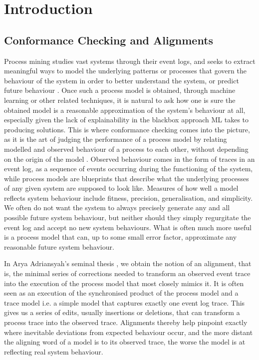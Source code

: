 \documentclass[conference]{IEEEtran}
\begin{document}
	\section{Introduction} 
	
	
	\subsection{Conformance Checking and Alignments} 
	
	Process mining studies vast systems through their event logs, and seeks to extract meaningful ways to model the underlying patterns or processes that govern the behaviour of the system in order to better understand the system, or predict future behaviour \cite{A16}.
	Once such a process model is obtained, through machine learning or other related techniques, it is natural to ask how one is sure the obtained model is a reasonable approximation of the system’s behaviour at all, especially given the lack of explainability in the blackbox approach ML takes to producing solutions.
	This is where conformance checking comes into the picture, as it is the art of judging the performance of a process model by relating modelled and observed behaviour of a process to each other, without depending on the origin of the model \cite{CDSW18}.
	Observed behaviour comes in the form of traces in an event log, as a sequence of events occurring during the functioning of the system, while process models are blueprints that describe what the underlying processes of any given system are supposed to look like.
	Measures of how well a model reflects system behaviour include fitness, precision, generalisation, and simplicity.
	We often do not want the system to always precisely generate any and all possible future system behaviour, but neither should they simply regurgitate the event log and accept no new system behaviours. 
	What is often much more useful is a process model that can, up to some small error factor, approximate any reasonable future system behaviour. 
	
	In Arya Adriansyah's seminal thesis \cite{Adriansyah2014AligningOA}, we obtain the notion of an alignment, that is, the minimal series of corrections needed to transform an observed event trace into the execution of the process model that most closely mimics it.  
	It is often seen as an execution of the synchronised product of the process model and a trace model i.e. a simple model that captures exactly one event log trace. 
	This gives us a series of edits, usually insertions or deletions, that can transform a process trace into the observed trace.  
	Alignments thereby help pinpoint exactly where inevitable deviations from expected behaviour occur, and the more distant the aligning word of a model is to its observed trace, the worse the model is at reflecting real system behaviour. 
	
\end{document}
